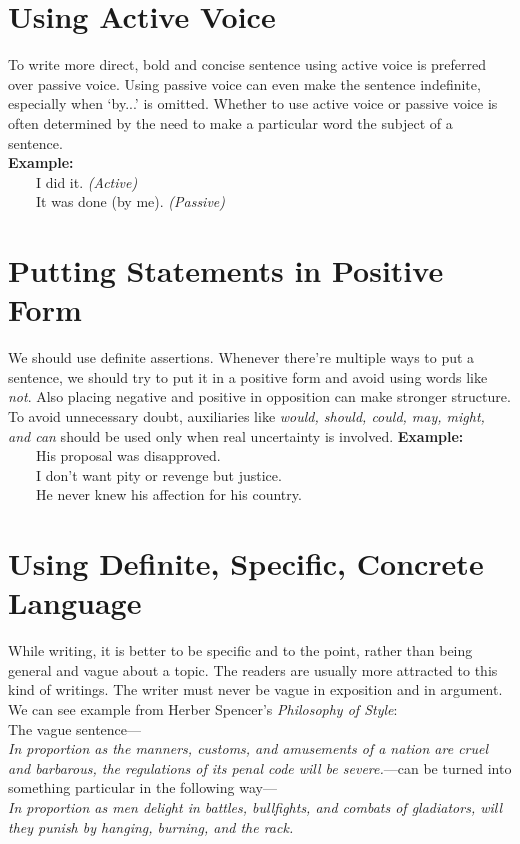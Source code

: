 \documentclass[12pt]{report}
\newcommand{\xmpl}{\textbf{Example:}\\} %
\newcommand{\indnt}{\ \ \ \ } %
\begin{document}
\section{Using Active Voice}
To write more direct, bold and concise sentence using active voice is preferred over passive voice. Using passive voice can even make the sentence indefinite, especially when `by...' is omitted. Whether to use active voice or passive voice is often determined by the need to make a particular word the subject of a sentence.\\
\xmpl
\indnt I did it. \emph{(Active)}\\
\indnt It was done (by me). \emph{(Passive)}


\section{Putting Statements in Positive Form}
We should use definite assertions. Whenever there're multiple ways to put a sentence, we should try to put it in a positive form and avoid using words like \emph{not}. Also placing negative and positive in opposition can make stronger structure. To avoid unnecessary doubt, auxiliaries like \emph{would, should, could, may, might, \emph{and} can} should be used only when real uncertainty is involved.
\xmpl
\indnt His proposal was disapproved.\\
\indnt I don't want pity or revenge but justice.\\
\indnt He never knew his affection for his country.\\


\section{Using Definite, Specific, Concrete Language}
While writing, it is better to be specific and to the point, rather than being general and vague about a topic. The readers are usually more attracted to this kind of writings. The writer must never be vague in exposition and in argument. We can see example from Herber Spencer's \textit{Philosophy of Style}:\\
The vague sentence---\\ \textit{In proportion as the manners, customs, and amusements of a nation are cruel and barbarous, the regulations of its penal code will be severe.}---can be turned into something particular in the following way---\\
\textit{In proportion as men delight in battles, bullfights, and combats of gladiators, will they punish by hanging, burning, and the rack.}\\
\end{document}

